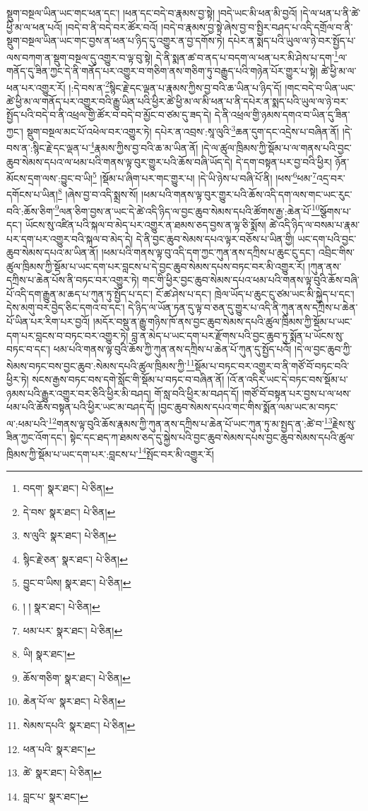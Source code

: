སྡུག་བསྔལ་ཡིན་ཡང་གང་ཕན་དང་། །ཕན་དང་བདེ་བ་རྣམས་བྱ་སྟེ། །བདེ་ཡང་མི་ཕན་མི་བྱའོ། །དེ་ལ་ཕན་པ་ནི་ཚེ་ཕྱི་མ་ལ་ཕན་པའོ། །བདེ་བ་ནི་བདེ་བར་ཚོར་བའོ། །བདེ་བ་རྣམས་བྱ་སྟེ་ཞེས་བྱ་བ་སྤྱིར་བཤད་པ་འདི་དགྲོལ་བ་ནི་སྡུག་བསྔལ་ཡིན་ཡང་གང་བྱས་ན་ཕན་པ་ཉིད་དུ་འགྱུར་ན་བྱ་དགོས་ཏེ། དཔེར་ན་སྨད་པའི་ཡུལ་ལ་ཉེ་བར་སྤྱོད་པ་ལས་བཀག་ན་སྡུག་བསྔལ་དུ་འགྱུར་བ་ལྟ་བུ་སྟེ། དེ་ནི་སྨན་ཚ་བ་ནད་པ་བདག་ལ་ཕན་པར་མི་ཤེས་པ་དག་\footnote{བདག་  སྣར་ཐང་།  པེ་ཅིན། }ལ་གནོད་དུ་ཟིན་ཀྱང་དེ་ནི་གནོད་པར་འགྱུར་བ་གཅིག་ནས་གཅིག་ཏུ་བརྒྱུད་པའི་གཉེན་པོར་གྱུར་པ་སྟེ། ཚེ་ཕྱི་མ་ལ་ཕན་པར་འགྱུར་རོ། །:དེ་བས་ན་\footnote{དེ་བས་  སྣར་ཐང་།  པེ་ཅིན། }སྙིང་རྗེ་དང་ལྡན་པ་རྣམས་ཀྱིས་བྱ་བའི་ཆ་ཡིན་པ་ཉིད་དོ། །གང་བདེ་བ་ཡིན་ཡང་ཚེ་ཕྱི་མ་ལ་གནོད་པར་འགྱུར་བའི་རྒྱུ་ཡིན་པའི་ཕྱིར་ཚེ་ཕྱི་མ་ལ་མི་ཕན་པ་ནི་དཔེར་ན་སྨད་པའི་ཡུལ་ལ་ཉེ་བར་སྤྱོད་པའི་བདེ་བ་ནི་འཕྲལ་གྱི་ཚོར་བ་བདེ་བ་མྱོང་བ་ཙམ་དུ་ཟད་དེ། དེ་ནི་འཕྲལ་གྱི་ཉམས་དགའ་བ་ཡིན་དུ་ཟིན་ཀྱང་། སྡུག་བསྔལ་མང་པོ་འཕེལ་བར་འགྱུར་ཏེ། དཔེར་ན་འབྲས་:སཱ་ལུའི་\footnote{ས་ལུའི་  སྣར་ཐང་།  པེ་ཅིན། }ཆན་དུག་དང་འདྲེས་པ་བཞིན་ནོ། །དེ་བས་ན་:སྙིང་རྗེ་དང་ལྡན་པ་\footnote{སྙིང་རྗེ་ཅན་  སྣར་ཐང་།  པེ་ཅིན། }རྣམས་ཀྱིས་བྱ་བའི་ཆ་མ་ཡིན་ནོ། །དེ་ལ་ཚུལ་ཁྲིམས་ཀྱི་སྡོམ་པ་ལ་གནས་པའི་བྱང་ཆུབ་སེམས་དཔའ་ལ་ཕམ་པའི་གནས་ལྟ་བུར་གྱུར་པའི་ཆོས་བཞི་ཡོད་དེ། དེ་དག་བསྟན་པར་བྱ་བའི་ཕྱིར། ཉོན་མོངས་དྲག་ལས་:བྱུང་བ་ཡི།\footnote{བྱུང་བ་ཡིས།  སྣར་ཐང་།  པེ་ཅིན། } །སྡོམ་པ་ཞིག་པར་གང་གྱུར་པ། །དེ་ཡི་ཉེས་པ་བཞི་པོ་ནི། །ཕས་\footnote{། །  སྣར་ཐང་།  པེ་ཅིན། }ཕམ་\footnote{ཕམ་པར་  སྣར་ཐང་།  པེ་ཅིན། }འདྲ་བར་དགོངས་པ་ཡིན།\footnote{ཡི།  སྣར་ཐང་། } །ཞེས་བྱ་བ་འདི་སྨྲས་སོ། །ཕམ་པའི་གནས་ལྟ་བུར་གྱུར་པའི་ཆོས་འདི་དག་ལས་གང་ཡང་རུང་བའི་:ཆོས་ཅིག་\footnote{ཆོས་གཅིག་  སྣར་ཐང་།  པེ་ཅིན། }ལན་ཅིག་བྱས་ན་ཡང་དེ་ཚེ་འདི་ཉིད་ལ་བྱང་ཆུབ་སེམས་དཔའི་ཚོགས་རྒྱ་:ཆེན་པོ་\footnote{ཆེན་པོ་ལ་  སྣར་ཐང་།  པེ་ཅིན། }སྩོགས་པ་དང་། ཡོངས་སུ་འཛིན་པའི་སྐལ་བ་མེད་པར་འགྱུར་ན་ཐམས་ཅད་བྱས་ན་ལྟ་ཅི་སྨོས། ཚེ་འདི་ཉིད་ལ་བསམ་པ་རྣམ་པར་དག་པར་འགྱུར་བའི་སྐལ་བ་མེད་དེ། དེ་ནི་བྱང་ཆུབ་སེམས་དཔའ་ལྟར་བཅོས་པ་ཡིན་གྱི། ཡང་དག་པའི་བྱང་ཆུབ་སེམས་དཔའ་མ་ཡིན་ནོ། །ཕམ་པའི་གནས་ལྟ་བུ་འདི་དག་ཀྱང་ཀུན་ནས་དཀྲིས་པ་ཆུང་ངུ་དང་། འབྲིང་གིས་ཚུལ་ཁྲིམས་ཀྱི་སྡོམ་པ་ཡང་དག་པར་བླངས་པ་དེ་བྱང་ཆུབ་སེམས་དཔས་བཏང་བར་མི་འགྱུར་རོ། །ཀུན་ནས་དཀྲིས་པ་ཆེན་པོས་ནི་བཏང་བར་འགྱུར་ཏེ། གང་གི་ཕྱིར་བྱང་ཆུབ་སེམས་དཔའ་ཕམ་པའི་གནས་ལྟ་བུའི་ཆོས་བཞི་པོ་འདི་དག་རྒྱུན་མ་ཆད་པ་ཀུན་ཏུ་སྤྱོད་པ་དང་། ངོ་ཚ་ཤེས་པ་དང་། ཁྲེལ་ཡོད་པ་ཆུང་ངུ་ཙམ་ཡང་མི་སྐྱེད་པ་དང་། དེས་མགུ་བར་བྱེད་ཅིང་དགའ་བ་དང་། དེ་ཉིད་ལ་ཡོན་ཏན་དུ་ལྟ་བ་ཅན་དུ་གྱུར་པ་འདི་ནི་ཀུན་ནས་དཀྲིས་པ་ཆེན་པོ་ཡིན་པར་རིག་པར་བྱའོ། །མདོར་བསྡུ་ན་རྒྱུ་གཉིས་ཁོ་ནས་བྱང་ཆུབ་སེམས་དཔའི་ཚུལ་ཁྲིམས་ཀྱི་སྡོམ་པ་ཡང་དག་པར་བླངས་བ་བཏང་བར་འགྱུར་ཏེ། བླ་ན་མེད་པ་ཡང་དག་པར་རྫོགས་པའི་བྱང་ཆུབ་ཏུ་སྨོན་པ་ཡོངས་སུ་བཏང་བ་དང་། ཕམ་པའི་གནས་ལྟ་བུའི་ཆོས་ཀྱི་ཀུན་ནས་དཀྲིས་པ་ཆེན་པོ་ཀུན་དུ་སྤྱོད་པའོ། །དེ་ལ་བྱང་ཆུབ་ཀྱི་སེམས་བཏང་བས་བྱང་ཆུབ་:སེམས་དཔའི་ཚུལ་ཁྲིམས་ཀྱི་\footnote{སེམས་དཔའི་  སྣར་ཐང་།  པེ་ཅིན། }སྡོམ་པ་བཏང་བར་འགྱུར་བ་ནི་གཙོ་བོ་བཏང་བའི་ཕྱིར་ཏེ། སངས་རྒྱས་བཏང་བས་དགེ་སློང་གི་སྡོམ་པ་བཏང་བ་བཞིན་ནོ། །འོ་ན་འདིར་ཡང་དེ་བཏང་བས་སྡོམ་པ་ཉམས་པའི་རྒྱུར་འགྱུར་བར་ཅིའི་ཕྱིར་མི་བཤད། གོ་སླ་བའི་ཕྱིར་མ་བཤད་དོ། །གཙོ་བོ་བསྟན་པར་བྱས་པ་ལ་ཕས་ཕམ་པའི་ཆོས་བསྟན་པའི་ཕྱིར་ཡང་མ་བཤད་དོ། །བྱང་ཆུབ་སེམས་དཔའ་གང་གིས་སྨོན་ལམ་ཡང་མ་བཏང་ལ་:ཕམ་པའི་\footnote{ཕན་པའི་  སྣར་ཐང་། }གནས་ལྟ་བུའི་ཆོས་རྣམས་ཀྱི་ཀུན་ནས་དཀྲིས་པ་ཆེན་པོ་ཡང་ཀུན་ཏུ་མ་སྤྱད་ན་:ཚེ་བ་\footnote{ཚེ་  སྣར་ཐང་།  པེ་ཅིན། }རྗེས་སུ་ཟིན་ཀྱང་འོག་དང་། སྟེང་དང་ཐད་ཀ་ཐམས་ཅད་དུ་སྐྱེས་པའི་བྱང་ཆུབ་སེམས་དཔས་བྱང་ཆུབ་སེམས་དཔའི་ཚུལ་ཁྲིམས་ཀྱི་སྡོམ་པ་ཡང་དག་པར་:བླངས་པ་\footnote{བླང་པ་  སྣར་ཐང་། }སྤོང་བར་མི་འགྱུར་རོ། 